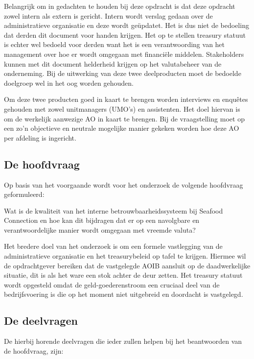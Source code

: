 Belangrijk om in gedachten te houden bij deze opdracht is dat deze opdracht zowel intern als extern is gericht. Intern wordt verslag gedaan over de administratieve organisatie en deze wordt geüpdatet. Het is dus niet de bedoeling dat derden dit document voor handen krijgen. Het op te stellen treasury statuut is echter wel bedoeld voor derden want het is een verantwoording van het management over hoe er wordt omgegaan met financiële middelen. Stakeholders kunnen met dit document helderheid krijgen op het valutabeheer van de onderneming. Bij de uitwerking van deze twee deelproducten moet de bedoelde doelgroep wel in het oog worden gehouden.

Om deze twee producten goed in kaart te brengen worden interviews en enquêtes gehouden met zowel unitmanagers (UMO's) en assistenten. Het doel hiervan is om de werkelijk aanwezige AO in kaart te brengen. Bij de vraagstelling moet op een zo'n objectieve en neutrale mogelijke manier gekeken worden hoe deze AO per afdeling is ingericht.

\subsection{De hoofdvraag}
Op basis van het voorgaande wordt voor het onderzoek de volgende hoofdvraag geformuleerd:

\bigskip

\noindent
\begin{center}
\textnormal{\large{Wat is de kwaliteit van het interne betrouwbaarheidssysteem bij Seafood Connection en hoe kan dit bijdragen dat er op een navolgbare en verantwoordelijke manier wordt omgegaan met vreemde valuta?}}
\end{center}

\bigskip

Het bredere doel van het onderzoek is om een formele vastlegging van de administratieve organisatie en het treasurybeleid op tafel te krijgen. Hiermee wil de opdrachtgever bereiken dat de vastgelegde AOIB aansluit op de daadwerkelijke situatie, dit is als het ware een stok achter de deur zetten. Het treasury statuut wordt opgesteld omdat de geld-goederenstroom een cruciaal deel van de bedrijfsvoering is die op het moment niet uitgebreid en doordacht is vastgelegd.
\subsection{De deelvragen}
De hierbij horende deelvragen die ieder zullen helpen bij het beantwoorden van de hoofdvraag, zijn:

